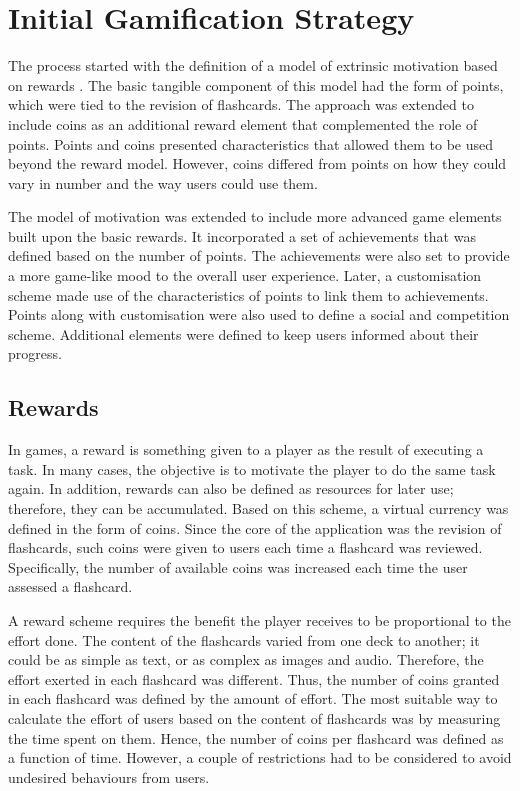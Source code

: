\section{Initial Gamification Strategy}
\label{desi-gamification-strategy}
The process started with the definition of a model of extrinsic motivation based on rewards \citep{richter2015studying}. The basic tangible component of this model had the form of points, which were tied to the revision of flashcards. The approach was extended to include coins as an additional reward element that complemented the role of points. Points and coins presented characteristics that allowed them to be used beyond the reward model. However, coins differed from points on how they could vary in number and the way users could use them.

The model of motivation was extended to include more advanced game elements built upon the basic rewards. It incorporated a set of achievements that was defined based on the number of points. The achievements were also set to provide a more game-like mood to the overall user experience. Later, a customisation scheme made use of the characteristics of points to link them to achievements. Points along with customisation were also used to define a social and competition scheme. Additional elements were defined to keep users informed about their progress.

\subsection{Rewards}
In games, a reward is something given to a player as the result of executing a task. In many cases, the objective is to motivate the player to do the same task again. In addition, rewards can also be defined as resources for later use; therefore, they can be accumulated. Based on this scheme, a virtual currency was defined in the form of coins. Since the core of the application was the revision of flashcards, such coins were given to users each time a flashcard was reviewed. Specifically, the number of available coins was increased each time the user assessed a flashcard.

A reward scheme requires the benefit the player receives to be proportional to the effort done. The content of the flashcards varied from one deck to another; it could be as simple as text, or as complex as images and audio. Therefore, the effort exerted in each flashcard was different. Thus, the number of coins granted in each flashcard was defined by the amount of effort. The most suitable way to calculate the effort of users based on the content of flashcards was by measuring the time spent on them. Hence, the number of coins per flashcard was defined as a function of time. However, a couple of restrictions had to be considered to avoid undesired behaviours from users.

